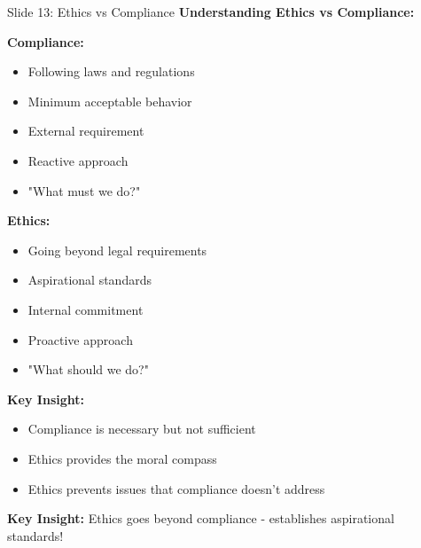 \documentclass[8pt]{beamer}
\begin{document}
	\begin{frame}{Slide 13: Ethics vs Compliance}
		\fontsize{6.5}{7.5}\selectfont
		\textbf{Understanding Ethics vs Compliance:}
		
		\vspace{0.1cm}
		\textbf{Compliance:}
		\begin{itemize}
			\item Following laws and regulations
			\item Minimum acceptable behavior
			\item External requirement
			\item Reactive approach
			\item "What must we do?"
		\end{itemize}
		
		\vspace{0.1cm}
		\textbf{Ethics:}
		\begin{itemize}
			\item Going beyond legal requirements
			\item Aspirational standards
			\item Internal commitment
			\item Proactive approach
			\item "What should we do?"
		\end{itemize}
		
		\vspace{0.1cm}
		\textbf{Key Insight:}
		\begin{itemize}
			\item Compliance is necessary but not sufficient
			\item Ethics provides the moral compass
			\item Ethics prevents issues that compliance doesn't address
		\end{itemize}
		
		\textcolor{myblue}{\textbf{Key Insight:}} Ethics goes \textcolor{myblue}{beyond compliance} - establishes aspirational standards!
	\end{frame}
	
\end{document}
